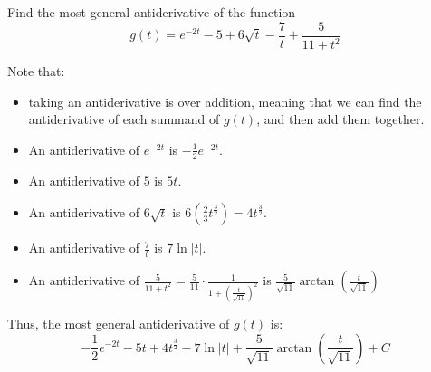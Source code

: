 \documentclass[handout,nooutcomes]{ximera}
\begin{document}
\begin{problem}
\begin{enumerate}
\begin{multicols}{2}
		
		
	\end{multicols}
	\end{enumerate}
		
		
		

\end{problem}
	
	
	
	
	
	
	
	
			
			

\begin{problem}
Find the most general antiderivative of the function
$$ g(t) = e^{-2t} - 5 + 6\sqrt{t}-\frac{7}{t} + \frac{5}{11 + t^2} $$
		\begin{freeResponse}
		Note that:
			\begin{itemize}
			\item  taking an antiderivative is  over addition, meaning that we can find the antiderivative of each summand of $g(t)$, and then add them together.
			\item  An antiderivative of $e^{-2t}$ is $-\frac{1}{2} e^{-2t}$.
			\item  An antiderivative of $5$ is $5t$.
			\item  An antiderivative of $6 \sqrt{t}$ is $6 \left( \frac{2}{3} t^{\frac{3}{2}} \right) = 4t^{\frac{3}{2}}$.
			\item  An antiderivative of $\frac{7}{t}$ is $7 \ln |t|$.
			\item  An antiderivative of $\frac{5}{11 + t^2} = \frac{5}{11} \cdot \frac{1}{1 + \left( \frac{t}{\sqrt{11}} \right)^2 }$
			is $\frac{5}{\sqrt{11}} \arctan \left( \frac{t}{\sqrt{11}} \right)$
			\end{itemize}
		Thus, the most general antiderivative of $g(t)$ is:
		$$ -\frac{1}{2} e^{-2t} - 5t + 4t^{\frac{3}{2}} - 7 \ln |t| + \frac{5}{\sqrt{11}} \arctan \left( \frac{t}{\sqrt{11}} \right) + C $$
		\end{freeResponse}
		
		
\end{problem}
\end{document}
